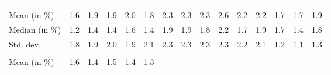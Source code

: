 \begin{tabular}{lllllllllllllll}
  \multicolumn{1}{r}{} &
  \multicolumn{1}{r}{} &
  \multicolumn{1}{r}{} &
  \multicolumn{1}{r}{} &
  \multicolumn{1}{r}{} &
  \multicolumn{1}{r}{} &
  \multicolumn{1}{r}{} &
  \multicolumn{1}{r}{} &
  \multicolumn{1}{r}{} &
  \multicolumn{1}{r}{} \\
\multicolumn{1}{l}{\hspace{2em}Mean (in $\%$)} &
  \multicolumn{1}{|r}{1.6} &
  \multicolumn{1}{r}{1.9} &
  \multicolumn{1}{r}{1.9} &
  \multicolumn{1}{r}{2.0} &
  \multicolumn{1}{r}{1.8} &
  \multicolumn{1}{r}{2.3} &
  \multicolumn{1}{r}{2.3} &
  \multicolumn{1}{r}{2.3} &
  \multicolumn{1}{r}{2.6} &
  \multicolumn{1}{r}{2.2} &
  \multicolumn{1}{r}{2.2} &
  \multicolumn{1}{r}{1.7} &
  \multicolumn{1}{r}{1.7} &
  \multicolumn{1}{r}{1.9} \\
\multicolumn{1}{l}{\hspace{2em}Median (in $\%$)} &
  \multicolumn{1}{|r}{1.2} &
  \multicolumn{1}{r}{1.4} &
  \multicolumn{1}{r}{1.4} &
  \multicolumn{1}{r}{1.6} &
  \multicolumn{1}{r}{1.4} &
  \multicolumn{1}{r}{1.9} &
  \multicolumn{1}{r}{1.9} &
  \multicolumn{1}{r}{1.8} &
  \multicolumn{1}{r}{2.2} &
  \multicolumn{1}{r}{1.7} &
  \multicolumn{1}{r}{1.9} &
  \multicolumn{1}{r}{1.7} &
  \multicolumn{1}{r}{1.4} &
  \multicolumn{1}{r}{1.8} \\
\multicolumn{1}{l}{\hspace{2em}Std. dev.} &
  \multicolumn{1}{|r}{1.8} &
  \multicolumn{1}{r}{1.9} &
  \multicolumn{1}{r}{2.0} &
  \multicolumn{1}{r}{1.9} &
  \multicolumn{1}{r}{2.1} &
  \multicolumn{1}{r}{2.3} &
  \multicolumn{1}{r}{2.3} &
  \multicolumn{1}{r}{2.3} &
  \multicolumn{1}{r}{2.3} &
  \multicolumn{1}{r}{2.2} &
  \multicolumn{1}{r}{2.1} &
  \multicolumn{1}{r}{1.2} &
  \multicolumn{1}{r}{1.1} &
  \multicolumn{1}{r}{1.3} \\
\multicolumn{1}{l}{\hspace{1em}{\textit{Additive term} ($\widehat{t}/\widetilde{p}$)}} &
  \multicolumn{1}{|r}{} &
  \multicolumn{1}{r}{} &
  \multicolumn{1}{r}{} &
  \multicolumn{1}{r}{} &
  \multicolumn{1}{r}{} &
  \multicolumn{1}{r}{} &
  \multicolumn{1}{r}{} &
  \multicolumn{1}{r}{} &
  \multicolumn{1}{r}{} &
  \multicolumn{1}{r}{} &
  \multicolumn{1}{r}{} &
  \multicolumn{1}{r}{} &
  \multicolumn{1}{r}{} &
  \multicolumn{1}{r}{} \\
\multicolumn{1}{l}{\hspace{2em}Mean (in $\%$)} &
  \multicolumn{1}{|r}{1.6} &
  \multicolumn{1}{r}{1.4} &
  \multicolumn{1}{r}{1.5} &
  \multicolumn{1}{r}{1.4} &
  \multicolumn{1}{r}{1.3} &

\end{tabular}
